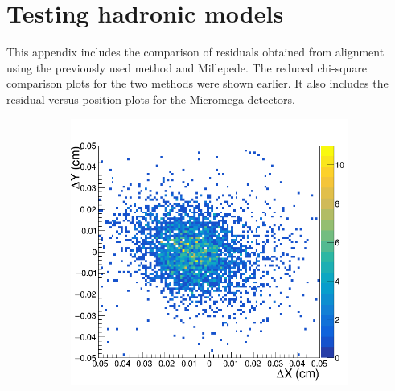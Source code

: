 \chapter{Testing hadronic models}
\label{sec:app_1}
This appendix includes the comparison of residuals obtained from alignment using the previously used method and Millepede. The reduced chi-square comparison plots for the two methods were shown earlier.
It also includes the residual versus position plots for the Micromega detectors.
\begin{figure}[h!]
\centering
 \begin{subfigure}[l]{.45\textwidth}
   \centering
   \includegraphics[width=\linewidth]{thesis_figures/alignment/Run_3211_after_prev/square/GEM1.png}


\end{subfigure}
\end{figure}

